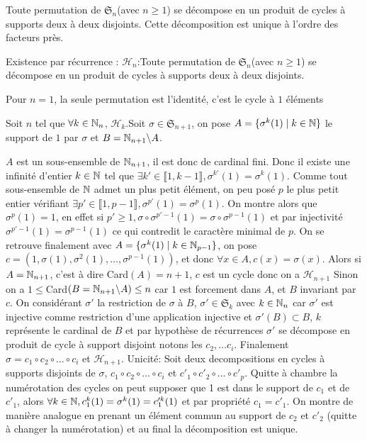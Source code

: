 \begin{theoreme}
    Toute permutation de $\mathfrak{S}_n$(avec $n\geq1$) se décompose en un produit de cycles à supports deux à deux disjoints. Cette décomposition est unique à l'ordre des facteurs près.
    
    \tcblower
    Existence par récurrence : $\mathcal{H}_n$:Toute permutation de $\mathfrak{S}_n$(avec $n\geq1$) se décompose en un produit de cycles à supports deux à deux disjoints.
    
    Pour $n=1$, la seule permutation est l'identité, c'est le cycle à $1$ éléments

    Soit $n$ tel que $\forall k\in\mathbb{N}_n$, $\mathcal{H}_k$.Soit $\sigma\in\mathfrak{S}_{n+1}$, on pose $A=\{\sigma^k(1)\mid k\in\mathbb{N}\}$ le support de $1$ par $\sigma$ et $B=\mathbb{N}_{n+1}\backslash A$.

    $A$ est un sous-ensemble de $\mathbb{N}_{n+1}$, il est donc de cardinal fini. Donc il existe une infinité d'entier $k\in\mathbb{N}$ tel que $\exists k'\in\llbracket 1,k-1\rrbracket,\sigma^{k'}(1)=\sigma^k(1)$.
    Comme tout sous-ensemble de $\mathbb{N}$ admet un plus petit élément, on peu posé $p$ le plus petit entier vérifiant $\exists p'\in\llbracket 1,p-1\rrbracket,\sigma^{p'}(1)=\sigma^p(1)$. On montre alors que $\sigma^p(1)=1$, en effet si $p'\geq 1,\sigma\circ\sigma^{p'-1}(1)=\sigma\circ\sigma^{p-1}(1)$ et par injectivité $\sigma^{p'-1}(1)=\sigma^{p-1}(1)$ ce qui contredit le caractère minimal de $p$.
    On se retrouve finalement avec $A=\{\sigma^k(1)\mid k\in\mathbb{N}_{p-1}\}$, on pose $c=(1,\sigma(1),\sigma^2(1),\dots,\sigma^{p-1}(1))$, et donc $\forall x\in A, c(x)=\sigma(x)$.
    Alors si $A=\mathbb{N}_{n+1}$, c'est à dire Card$(A)=n+1$, $c$ est un cycle donc on a $\mathcal{H}_{n+1}$
    Sinon on a $1\leq$Card$(B=\mathbb{N}_{n+1}\backslash A)\leq n$ car $1$ est forcement dans $A$, et $B$ invariant par $c$. On considérant $\sigma'$ la restriction de $\sigma$ à $B$, $\sigma'\in\mathfrak{S}_k$ avec $k\in\mathbb{N}_n$ car $\sigma'$ est injective comme restriction d'une application injective et $\sigma'(B)\subset B$, $k$ représente le cardinal de $B$ et par hypothèse de récurrences $\sigma'$ se décompose en produit de cycle à support disjoint notons les $c_2,\dots c_i$.
    Finalement $\sigma=c_1\circ c_2\circ\dots\circ c_i$ et $\mathcal{H}_{n+1}$.
    Unicité: Soit deux decompositions en cycles à supports disjoints de $\sigma$, $c_1\circ c_2\circ\dots\circ c_i$ et $c'_1\circ c'_2\circ\dots\circ c'_p$. Quitte à chambre la numérotation des cycles on peut supposer que 1 est dans le support de $c_1$ et de $c'_1$,
    alors $\forall k\in\mathbb{N},c_1^k(1)=\sigma^k(1)=c'^k_1(1)$ et par propriété $c_1=c'_1$. On montre de manière analogue en prenant un élément commun au support de $c_2$ et $c'_2$ (quitte à changer la numérotation) et au final la décomposition est unique.
    
\end{theoreme}
